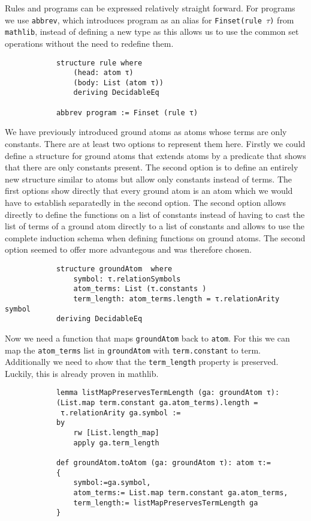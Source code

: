 \documentclass{article}
\begin{document}
        Rules and programs can be expressed relatively straight forward. For programs we use \texttt{abbrev}, which introduces program as an alias for \texttt{Finset(rule $\tau$)} from \texttt{mathlib},  instead of defining a new type as this allows us to use the common set operations without the need to redefine them.

        \begin{lstlisting}
            structure rule where
                (head: atom τ)
                (body: List (atom τ))
                deriving DecidableEq

            abbrev program := Finset (rule τ)
        \end{lstlisting}

        We have previously introduced ground atoms as atoms whose terms are only constants. There are at least two options to represent them here. Firstly we could define a structure for ground atoms that extends atoms by a predicate that shows that there are only constants present. The second option is to define an entirely new structure similar to atoms but allow only constants instead of terms. The first options show directly that every ground atom is an atom which we would have to establish separatedly in the second option. The second option allows directly to define the functions on a list of constants instead of having to cast the list of terms of a ground atom directly to a list of constants and allows to use the complete induction schema when defining functions on ground atoms. The second option seemed to offer more advantegous and was therefore chosen.

        \begin{lstlisting}
            structure groundAtom  where
                symbol: τ.relationSymbols
                atom_terms: List (τ.constants )
                term_length: atom_terms.length = τ.relationArity symbol
            deriving DecidableEq
        \end{lstlisting}

        Now we need a function that maps \texttt{groundAtom} back to \texttt{atom}. For this we can map the \texttt{atom\_terms} list in \texttt{groundAtom} with \texttt{term.constant} to term. Additionally we need to show that the \texttt{term\_length} property is preserved. Luckily, this is already proven in mathlib.


        \begin{lstlisting}
            lemma listMapPreservesTermLength (ga: groundAtom τ): 
            (List.map term.constant ga.atom_terms).length = 
             τ.relationArity ga.symbol :=
            by
                rw [List.length_map]
                apply ga.term_length

            def groundAtom.toAtom (ga: groundAtom τ): atom τ:= 
            {
                symbol:=ga.symbol,
                atom_terms:= List.map term.constant ga.atom_terms,
                term_length:= listMapPreservesTermLength ga
            }
        \end{lstlisting}
\end{document}
